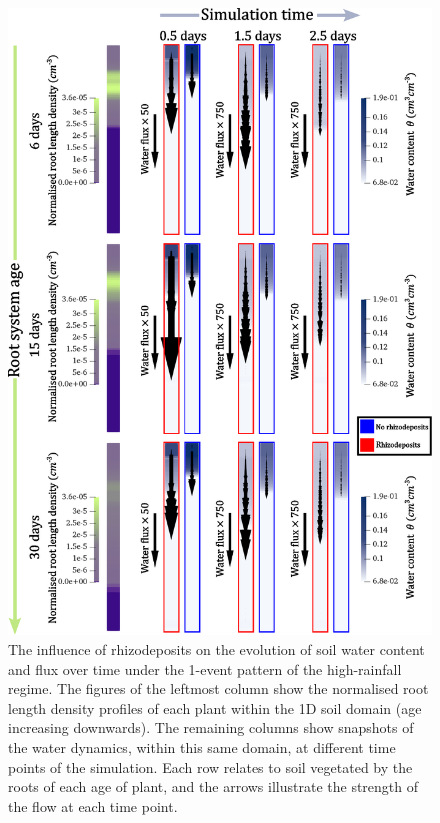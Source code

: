 \documentclass[11pt,a4paper]{article}
\numberwithin{equation}{section}
\begin{document}
\begin{figure}
	\centering
	\includegraphics[width = 0.75\linewidth, keepaspectratio]{madrid_1_event.eps}
	\caption{The influence of rhizodeposits on the evolution of soil water content and flux over time under the 1-event pattern of the high-rainfall regime. The figures of the leftmost column show the normalised root length density profiles of each plant within the 1D soil domain (age increasing downwards). The remaining columns show snapshots of the water dynamics, within this same domain, at different time points of the simulation. Each row relates to soil vegetated by the roots of each age of plant, and the arrows illustrate the strength of the flow at each time point.}
	\label{figure: madrid_1_event_fluxes}
\end{figure}
  
\end{document}
